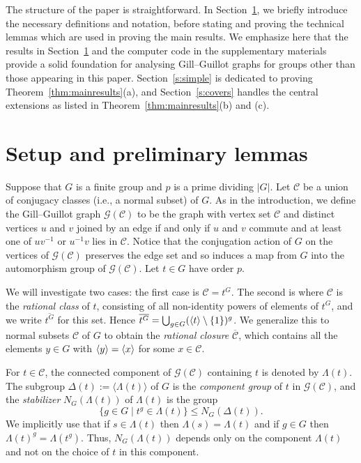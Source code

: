 \documentclass[11pt,a4paper]{amsart}
\theoremstyle{plain}
\theoremstyle{definition}
\theoremstyle{remark}
\theoremstyle{remark}
\theoremstyle{remark}
\theoremstyle{definition}
\newcommand{\GG}{\mathcal{G}}
\DeclarePairedDelimiter{\gen}{\langle}{\rangle}
\begin{document}
The structure of the paper is straightforward. In Section~\ref{Setup}, we briefly introduce the necessary definitions and notation, before stating and proving the technical lemmas which are used in proving the main results. We emphasize here that the results in Section~\ref{Setup} and the computer code in the supplementary materials provide a solid foundation for analysing Gill--Guillot graphs for groups other than those appearing in this paper. Section~\ref{s:simple} is dedicated to proving Theorem~\ref{thm:mainresults}(a), and Section~\ref{s:covers} handles the central extensions as listed in Theorem~\ref{thm:mainresults}(b) and (c).

\section{Setup and preliminary lemmas}\label{Setup}

Suppose that $G$ is a finite group and $p$ is a prime dividing $|G|$. Let $\mathcal C$ be a union of conjugacy classes (i.e., a normal subset) of $G$. As in the introduction, we define the Gill--Guillot graph $\GG(\mathcal C)$ to be the graph with vertex set $\mathcal C$ and distinct vertices $u$ and $v$ joined by an edge if and only if $u$ and $v$ commute and at least one of $uv^{-1}$ or $u^{-1}v$ lies in $\mathcal C$. Notice that the conjugation action of $G$ on the vertices of $\GG(\mathcal C)$ preserves the edge set and so induces a map from $G$ into the automorphism group of $\GG(\mathcal C)$. Let $t \in G$ have order $p$.

We will investigate two cases: the first case is $\mathcal C=t^G$. The second is where $\mathcal C$ is the \emph{rational class} of $t$, consisting of all non-identity powers of elements of $t^G$, and we write $\overline{t^G}$ for this set. Hence $ \overline{t^G}=\bigcup_{g\in G} (\gen{t}\setminus \{1\})^g$.
We generalize this to normal subsets $\mathcal C$ of $G$ to obtain the \emph{rational closure} $\overline {\mathcal C}$, which contains all the elements $y \in G$ with $\gen{y} =\gen{x}$ for some $x \in \mathcal C$.

For $t \in \mathcal C$, the connected component of $\GG(\mathcal C)$ containing $t$ is denoted by $\Lambda(t)$.
 The subgroup $\Delta(t):=\langle \Lambda(t)\rangle$ of $G$ is the \emph{component group} of $t$ in $\GG(\mathcal C)$, and the \emph{stabilizer} $N_G(\Lambda(t))$ of $\Lambda(t)$ is the group
\[ \{g\in G\mid t^g\in \Lambda(t)\}\le N_G(\Delta(t)).\]
We implicitly use that if $s\in \Lambda(t)$ then $\Lambda(s)=\Lambda(t)$ and if $g \in G$ then $\Lambda(t)^g=\Lambda(t^g)$. Thus, $N_G(\Lambda(t))$ depends only on the component $\Lambda(t)$ and not on the choice of $t$ in this component.
\end{document}
